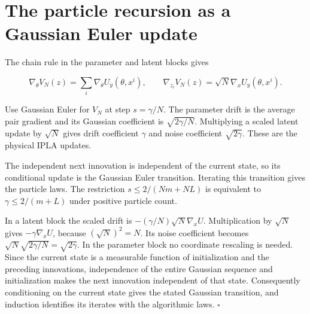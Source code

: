 \documentclass[11pt,a4paper]{report}
\begin{document}
\section{\texorpdfstring{The particle recursion as a Gaussian Euler update}{The particle recursion as a Gaussian Euler update}}



The chain rule in the parameter and latent blocks gives

\[\nabla_\theta V_N(z)=\sum_i\nabla_\theta U_y(\theta,x^i),\qquad
\nabla_{z_i}V_N(z)=\sqrt N\nabla_xU_y(\theta,x^i).\]

Use Gaussian Euler for \(V_N\) at step \(s=\gamma/N\). The parameter drift is the average pair gradient and its Gaussian coefficient is \(\sqrt{2\gamma/N}\). Multiplying a scaled latent update by \(\sqrt N\) gives drift coefficient \(\gamma\) and noise coefficient \(\sqrt{2\gamma}\). These are the physical IPLA updates.



The independent next innovation is independent of the current state, so its conditional update is the Gaussian Euler transition. Iterating this transition gives the particle laws. The restriction \(s\le2/(Nm+NL)\) is equivalent to \(\gamma\le2/(m+L)\) under positive particle count.




In a latent block the scaled drift is \(-(\gamma/N)\sqrt N\nabla_xU\). Multiplication by \(\sqrt N\) gives \(-\gamma\nabla_xU\), because \((\sqrt N)^2=N\). Its noise coefficient becomes \(\sqrt N\sqrt{2\gamma/N}=\sqrt{2\gamma}\). In the parameter block no coordinate rescaling is needed. Since the current state is a measurable function of initialization and the preceding innovations, independence of the entire Gaussian sequence and initialization makes the next innovation independent of that state. Consequently conditioning on the current state gives the stated Gaussian transition, and induction identifies its iterates with the algorithmic laws. \(\square\)
\end{document}

